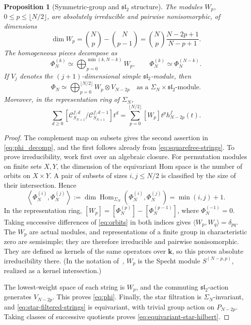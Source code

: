 \documentclass[reqno]{article}
\theoremstyle{plain} %
\newtheorem{proposition}[theorem]{Proposition}
\theoremstyle{definition}
\theoremstyle{remark}
\DeclareMathOperator{\Hom}{Hom}
\renewcommand{\sl}{\mathfrak{sl}_2}
\newcommand{\K} {\mathbf{k}}
\newcommand {\CC}{\mathscr{C}}
\numberwithin{equation}{section}
\begin{document}
\begin{proposition}[Symmetric-group and $\sl$ structure]
\label{prop:symm}
The modules $W_p$, $0\le p\le\lfloor N/2\rfloor$, are absolutely
irreducible and pairwise nonisomorphic, of dimensions
\begin{equation}\label{eq:dimW}
 \dim W_p=\binom Np-\binom N{p-1}
         =\binom Np\frac{N-2p+1}{N-p+1}.
\end{equation}
The homogeneous pieces decompose as
\begin{equation}\label{eq:phi_decomp}
 \Phi_N^{(k)}\simeq
 \bigoplus_{p=0}^{\min(k,N-k)}W_p,
 \qquad \Phi_N^{(k)}\simeq\Phi_N^{(N-k)}.
\end{equation}
If $V_j$ denotes the $(j+1)$-dimensional simple $\sl$-module, then
\begin{equation}\label{eq:phi}
 \Phi_N\simeq
 \bigoplus_{p=0}^{\lfloor N/2\rfloor}W_p\otimes V_{N-2p}
 \quad\text{as a }\Sigma_N\times\sl\text{-module}.
\end{equation}
Moreover, in the representation ring of $\Sigma_N$,
\begin{equation}\label{eq:equivariant-star-hilbert}
 \sum_{d\ge0}
 [\CC_{S_{N+1}}^{f,d}/\CC_{S_{N+1}}^{f,d-1}]t^d
 =\sum_{p=0}^{\lfloor N/2\rfloor}[W_p]t^p h_{N-2p}^f(t).
\end{equation}
\end{proposition}
\begin{proof}
The complement map on subsets gives the second assertion in
\eqref{eq:phi_decomp}, and the first follows already from
\eqref{eq:squarefree-strings}. To prove irreducibility, work first
over an algebraic closure. For permutation modules on finite sets
$X,Y$, the dimension of the equivariant Hom space is the number of
orbits on $X\times Y$. A pair of subsets of sizes $i,j\le N/2$
is classified by the size of their intersection. Hence
\begin{equation}\label{eq:orbits}
 \left\langle\Phi_N^{(i)},\Phi_N^{(j)}\right\rangle
 :=\dim\Hom_{\Sigma_N}(\Phi_N^{(i)},\Phi_N^{(j)})
 =\min(i,j)+1.
\end{equation}
In the representation ring,
$[W_p]=[\Phi_N^{(p)}]-[\Phi_N^{(p-1)}]$, where
$\Phi_N^{(-1)}=0$. Taking successive differences of
\eqref{eq:orbits} in both indices gives
$\langle W_p,W_q\rangle=\delta_{pq}$.
The $W_p$ are actual modules, and representations of a finite group
in characteristic zero are semisimple; they are therefore irreducible
and pairwise nonisomorphic. They are defined as kernels of the same
operators over $\K$, so this proves absolute irreducibility there.
(In the notation of~\cite{James}, $W_p$ is the Specht module
$S^{(N-p,p)}$, realized as a kernel intersection.)

The lowest-weight space of each string is $W_p$, and the commuting
$\sl$-action generates $V_{N-2p}$. This proves \eqref{eq:phi}.
Finally, the star filtration is $\Sigma_N$-invariant, and
\eqref{eq:star-filtered-strings} is equivariant, with trivial group
action on $P_{N-2p}$. Taking classes of successive quotients proves
\eqref{eq:equivariant-star-hilbert}.
\end{proof}
\end{document}
